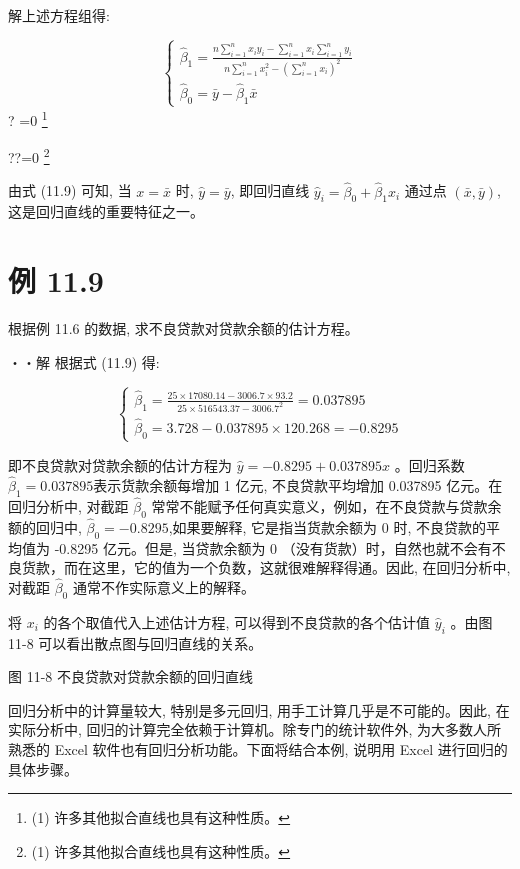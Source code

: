 \documentclass[10pt]{article}
\let\svthefootnote\thefootnote
\newcommand\blfootnotetext[1]{%
  \let\thefootnote\relax\footnote{#1}%
  \addtocounter{footnote}{-1}%
  \let\thefootnote\svthefootnote%
}
\let\svfootnotetext\footnotetext
\renewcommand\footnotetext[2][?]{%
  \if\relax#1\relax%
    \ifnum\value{footnote}=0\blfootnotetext{#2}\else\svfootnotetext{#2}\fi%
  \else%
    \if?#1\ifnum\value{footnote}=0\blfootnotetext{#2}\else\svfootnotetext{#2}\fi%
    \else\svfootnotetext[#1]{#2}\fi%
  \fi
}
\begin{document}
\begin{CJK*}{UTF8}{bsmi}
解上述方程组得:

\[
\left\{\begin{array}{l}
\hat{\beta}_{1}=\frac{n \sum_{i=1}^{n} x_{i} y_{i}-\sum_{i=1}^{n} x_{i} \sum_{i=1}^{n} y_{i}}{n \sum_{i=1}^{n} x_{i}^{2}-\left(\sum_{i=1}^{n} x_{i}\right)^{2}}  \tag{11.9}\\
\hat{\beta}_{0}=\bar{y}-\hat{\beta}_{1} \bar{x}
\end{array}\right.
\]
由式 (11.9) 可知, 当 $x=\bar{x}$ 时, $\hat{y}=\bar{y}$, 即回归直线 $\hat{y}_{i}=\hat{\beta}_{0}+\hat{\beta}_{1} x_{i}$ 通过点 $(\bar{x}, \bar{y})$,这是回归直线的重要特征之一。

\section*{例 11.9}
根据例 11.6 的数据, 求不良贷款对贷款余额的估计方程。

・・解 根据式 (11.9) 得:

$$
\left\{\begin{array}{l}
\hat{\beta}_{1}=\frac{25 \times 17080.14-3006.7 \times 93.2}{25 \times 516543.37-3006.7^{2}}=0.037895 \\
\hat{\beta}_{0}=3.728-0.037895 \times 120.268=-0.8295
\end{array}\right.
$$

即不良贷款对贷款余额的估计方程为 $\hat{y}=-0.8295+0.037895 x$ 。回归系数 $\hat{\beta}_{1}=0.037895$表示货款余额每增加 1 亿元, 不良贷款平均增加 0.037895 亿元。在回归分析中, 对截距 $\hat{\beta}_{0}$ 常常不能赋予任何真实意义，例如，在不良贷款与贷款余额的回归中, $\hat{\beta}_{0}=-0.8295$,如果要解释, 它是指当货款余额为 0 时, 不良贷款的平均值为 -0.8295 亿元。但是, 当贷款余额为 0 （没有货款）时，自然也就不会有不良货款，而在这里，它的值为一个负数，这就很难解释得通。因此, 在回归分析中, 对截距 $\hat{\beta}_{0}$ 通常不作实际意义上的解释。

将 $x_{i}$ 的各个取值代入上述估计方程, 可以得到不良贷款的各个估计值 $\hat{y}_{i}$ 。由图 11-8 可以看出散点图与回归直线的关系。

\begin{center}
\end{center}

图 11-8 不良贷款对贷款余额的回归直线

回归分析中的计算量较大, 特别是多元回归, 用手工计算几乎是不可能的。因此, 在实际分析中, 回归的计算完全依赖于计算机。除专门的统计软件外, 为大多数人所熟悉的 Excel 软件也有回归分析功能。下面将结合本例, 说明用 Excel 进行回归的具体步骤。


\end{CJK*}
\end{document}
